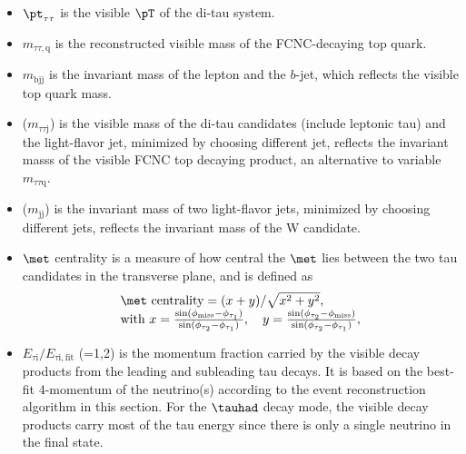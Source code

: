\begin{itemize}
\item ${\pt}_{\tau\tau}$ is the visible $\pT$ of the di-tau system.
\item $m_{\tau\tau,\text{q}}$ is the reconstructed visible mass of the FCNC-decaying top quark.
\item $m_{\text{bjj}}$ is the invariant mass of the lepton and the $b$-jet, which reflects the visible top quark mass.
\item {}($m_{\tau\tau \text{j}}$) is the visible mass of the di-tau candidates (include leptonic tau) and the light-flavor jet, minimized by choosing different jet, reflects the invariant masss of the visible FCNC top decaying product, an alternative to variable $m_{\tau\tau\text{q}}$.
\item {}($m_{\text{jj}}$) is the invariant mass of two light-flavor jets, minimized by choosing different jets, reflects the invariant mass of the W candidate.
\item $\met$ centrality is a measure of how central the $\met$ lies between the two tau candidates in the transverse plane, and is defined as
\begin{eqnarray}
\begin{array}{l}
\met~\text{centrality} = {(x+y)}/{\sqrt{x^2+y^2}}, \\
\text{with}~x=\frac{\sin(\phi_{\text{miss}}-\phi_{\tau_1})}{\sin(\phi_{\tau_2}-\phi_{\tau_1})}, \quad  y=\frac{\sin(\phi_{\tau_2}-\phi_{\text{miss}})}{\sin(\phi_{\tau_2}-\phi_{\tau_1})} ,
\end{array}
\label{eq:eq3}
\end{eqnarray}
\item $E_{\tau\text{i}}/E_{\tau\text{i},\text{fit}}$ (=1,2) is the momentum fraction carried by the visible decay products from the leading and subleading tau decays. It is based on the best-fit 4-momentum of the neutrino(s) according to the event reconstruction algorithm in this section. For the $\tauhad$ decay mode, the visible decay products carry most of the tau energy since there is only a single neutrino in the final state.%

\end{itemize}
